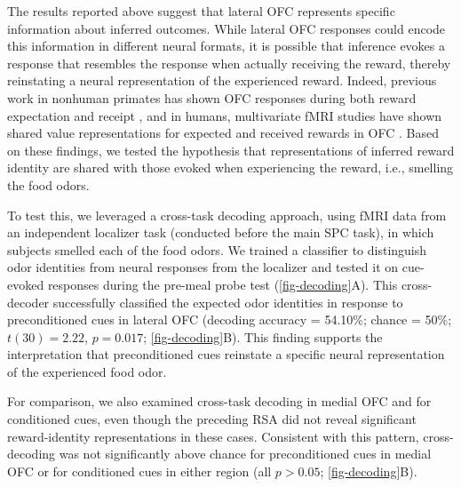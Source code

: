 \documentclass[12pt,letterpaper]{article}
\DeclareRobustCommand{\hl}{\textcolor{reviewtext}}
\begin{document}
The results reported above suggest that lateral OFC represents specific information about inferred outcomes. \hl{While lateral OFC responses could encode this information in different neural formats, it is possible that inference evokes a response that resembles the response when actually receiving the reward, thereby reinstating a neural representation of the experienced reward.} Indeed, previous work in nonhuman primates has shown OFC responses during both reward expectation and receipt \citep{tremblay1999relative}, and in humans, multivariate fMRI studies have shown shared value representations for expected and received rewards in OFC \citep{RN1,kahnt2011decoding}. Based on these findings, we tested the hypothesis that representations of inferred reward identity are shared with those evoked when experiencing the reward, i.e., smelling the food odors.

To test this, we leveraged a cross-task decoding approach, using fMRI data from an independent localizer task (conducted before the main SPC task), in which subjects smelled each of the food odors. We trained a classifier to distinguish odor identities from neural responses from the localizer and tested it on cue-evoked responses during the pre-meal probe test (\autoref{fig-decoding}A). This cross-decoder successfully classified the expected odor identities in response to preconditioned cues in lateral OFC (decoding accuracy = 54.10\%; chance = 50\%; $t(30) = 2.22$, $p = 0.017$; \autoref{fig-decoding}B). This finding supports the interpretation that preconditioned cues reinstate a specific neural representation of the experienced food odor.

For comparison, we also examined cross-task decoding in medial OFC and for conditioned cues, even though the preceding RSA did not reveal significant reward-identity representations in these cases. Consistent with this pattern, cross-decoding was not significantly above chance for preconditioned cues in medial OFC or for conditioned cues in either region (all $p > 0.05$; \autoref{fig-decoding}B).




\par\bigskip\begingroup
{}
\end{document}
